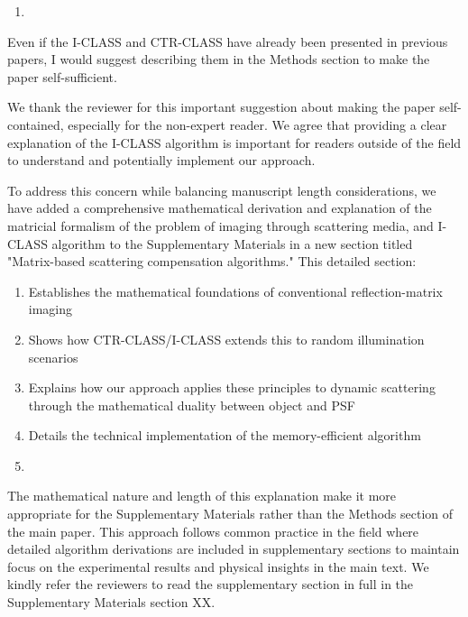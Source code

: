 \documentclass[12pt]{article}
\newenvironment{solved_reviewercomment}
    {\begin{tcolorbox}[width=\linewidth,colback=gray!5,colframe=solved_commentcolor!50,title=Reviewer Comment,left=5pt,right=5pt]}
    {\end{tcolorbox}}
\newenvironment{ourresponse}
    {\begin{tcolorbox}[width=\linewidth,breakable,enhanced,colback=gray!5,colframe=responsecolor!50,title=Response,left=5pt,right=5pt]}
    {\end{tcolorbox}}
\begin{document}
    
\begin{enumerate}[label=\arabic*., resume]
\item \leavevmode
\end{enumerate}
\vspace{-1em}
\begin{solved_reviewercomment}
    Even if the I-CLASS and CTR-CLASS have already been presented in previous papers, I would suggest describing them in the Methods section to make the paper self-sufficient. 
\end{solved_reviewercomment}

\begin{ourresponse}
We thank the reviewer for this important suggestion about making the paper self-contained, especially for the non-expert reader. We agree that providing a clear explanation of the I-CLASS algorithm is important for readers outside of the field to understand and potentially implement our approach.

To address this concern while balancing manuscript length considerations, we have added a comprehensive mathematical derivation and explanation of the matricial formalism of the problem of imaging through scattering media, and I-CLASS algorithm to the Supplementary Materials in a new section titled "Matrix-based scattering compensation algorithms." This detailed section:

\begin{enumerate}
    \item Establishes the mathematical foundations of conventional reflection-matrix imaging
    \item Shows how CTR-CLASS/I-CLASS extends this to random illumination scenarios
    \item Explains how our approach applies these principles to dynamic scattering through the mathematical duality between object and PSF
    \item Details the technical implementation of the memory-efficient algorithm
    \item \end{enumerate}

The mathematical nature and length of this explanation make it more appropriate for the Supplementary Materials rather than the Methods section of the main paper. This approach follows common practice in the field where detailed algorithm derivations are included in supplementary sections to maintain focus on the experimental results and physical insights in the main text.
We kindly refer the reviewers to read the supplementary section in full in the Supplementary Materials section XX.

\end{ourresponse}
\end{document}
